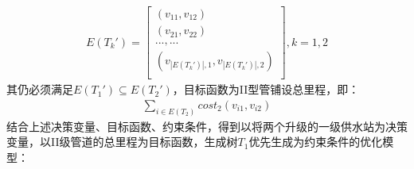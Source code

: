 \documentclass{whutmod}
\begin{document}
			\begin{gather}
			E(T_k')=
		\begin{bmatrix}
		(v_{11} ,v_{12}) \\ 
		(v_{21} ,v_{22} )\\ 
		...,...\\
		(v_{|E(T_k')|,1},v_{|E(T_k')|,2})\\
		\end{bmatrix},k=1,2
			\end{gather}
			其仍必须满足$E(T_1')\subseteq E(T_2')$，目标函数为II型管铺设总里程，即：
			\begin{gather}
			\sum_{i\in E(T_2) }cost_2(v_{i1},v_{i2})
			\end{gather}
			结合上述决策变量、目标函数、约束条件，得到以将两个升级的一级供水站为决策变量，以II级管道的总里程为目标函数，生成树$T_1$优先生成为约束条件的优化模型：
\end{document}
